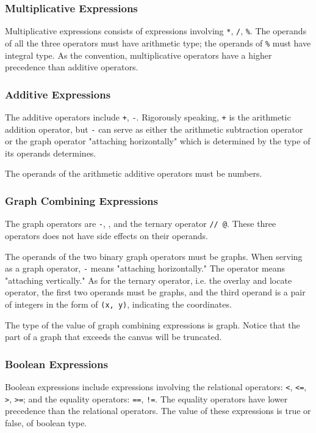 \documentclass[11pt,letterpaper]{article}
\begin{document}
\subsubsection {Multiplicative Expressions}
Multiplicative expressions consists of expressions involving \texttt{*}, \texttt{/}, \texttt{\%}. The operands of all the three operators must have arithmetic type; the operands of \texttt{\%} must have integral type. As the convention, multiplicative operators have a higher precedence than additive operators. 

\subsubsection {Additive Expressions}
The additive operators include \texttt{+}, \texttt{-}. Rigorously speaking, \texttt{+} is the arithmetic addition operator, but \texttt{-} can serve as either the arithmetic subtraction operator or the graph operator "attaching horizontally" which is determined by the type of its operands determines.

The operands of the arithmetic additive operators must be numbers.

\subsubsection {Graph Combining Expressions}
The graph operators are \texttt{-}, \textbar, and the ternary operator \texttt{// @}. These three operators does not have side effects on their operands.

The operands of the two binary graph operators must be graphs. When serving as a graph operator, \texttt{-} means "attaching horizontally." The operator \textbar means "attaching vertically." As for the ternary operator, i.e. the overlay and locate operator, the first two operands must be graphs, and the third operand is a pair of integers in the form of \texttt{(x, y)}, indicating the coordinates.

The type of the value of graph combining expressions is graph. Notice that the part of a graph that exceeds the canvas will be truncated.

\subsubsection {Boolean Expressions}
Boolean expressions include expressions involving the relational operators:  \texttt {\textless},  \texttt {\textless=},  \texttt{\textgreater},  \texttt{\textgreater=};  and the equality operators: \texttt{==}, \texttt{!=}. The equality operators have lower precedence than the relational operators. The value of these expressions is true or false, of boolean type.
\end{document}

